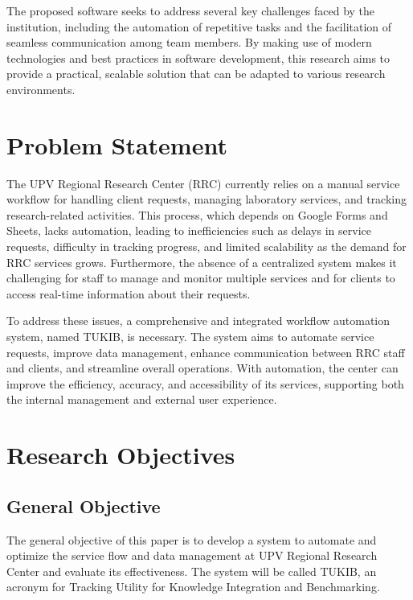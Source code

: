 The proposed software seeks to address several key challenges faced by the institution, including the automation of repetitive tasks and the facilitation of seamless communication among team members. By making use of modern technologies and best practices in software development, this research aims to provide a practical, scalable solution that can be adapted to various research environments.

\section{Problem Statement}

The UPV Regional Research Center (RRC) currently relies on a manual service workflow for handling client requests, managing laboratory services, and tracking research-related activities. This process, which depends on Google Forms and Sheets, lacks automation, leading to inefficiencies such as delays in service requests, difficulty in tracking progress, and limited scalability as the demand for RRC services grows. Furthermore, the absence of a centralized system makes it challenging for staff to manage and monitor multiple services and for clients to access real-time information about their requests.

To address these issues, a comprehensive and integrated workflow automation system, named TUKIB, is necessary. The system aims to automate service requests, improve data management, enhance communication between RRC staff and clients, and streamline overall operations. With automation, the center can improve the efficiency, accuracy, and accessibility of its services, supporting both the internal management and external user experience.

\section{Research Objectives}
\label{sec:researchobjectives}

\subsection{General Objective}
\label{sec:generalobjective}

The general objective of this paper is to develop a system to automate and optimize the service flow and data management at UPV Regional Research Center and evaluate its effectiveness. The system will be called TUKIB, an acronym for Tracking Utility for Knowledge Integration and Benchmarking. 

